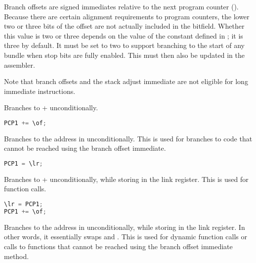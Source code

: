 Branch offsets are signed immediates relative to the next program counter
(). Because there are certain alignment requirements to program
counters, the lower two or three bits of the offset are not actually included
in the bitfield. Whether this value is two or three depends on the value of the
 constant defined in ; it
is three by default. It must be set to two to support branching to the start of
any bundle when stop bits are fully enabled. This must then also be updated in
the assembler.

Note that branch offsets and the stack adjust immediate are not eligible for 
long immediate instructions.

Branches to  + \code{\of} unconditionally.

\begin{lstlisting}[numbers=none, basicstyle=\ttfamily\footnotesize, language=C++]
PCP1 += \of;
\end{lstlisting}

Branches to the address in \code{\lr} unconditionally. This is used for branches 
to code that cannot be reached using the branch offset immediate.

\begin{lstlisting}[numbers=none, basicstyle=\ttfamily\footnotesize, language=C++]
PCP1 = \lr;
\end{lstlisting}

Branches to  + \code{\of} unconditionally, while storing  
in the link register. This is used for function calls.

\begin{lstlisting}[numbers=none, basicstyle=\ttfamily\footnotesize, language=C++]
\lr = PCP1;
PCP1 += \of;
\end{lstlisting}

Branches to the address in \code{\lr} unconditionally, while storing  
in the link register. In other words, it essentially swaps  and 
\code{\lr}. This is used for dynamic function calls or calls to functions that 
cannot be reached using the branch offset immediate method.


